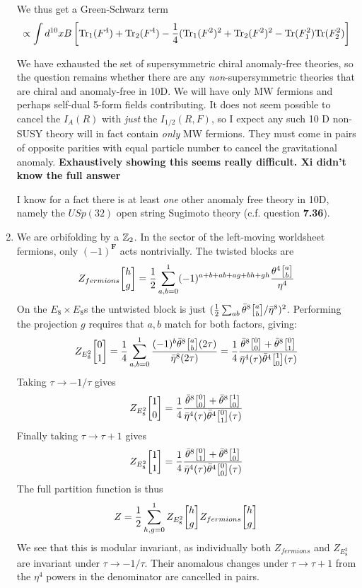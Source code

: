 \documentclass[11pt, class=article, crop=false]{standalone}
\begin{document}
\begin{enumerate}
	We thus get a Green-Schwarz term
	\[
		\propto \int d^{10} x B \left[\mathrm{Tr}_1 (F^4) + \mathrm{Tr}_2 (F^4) - \frac14 (\mathrm{Tr}_1(F^2)^2 + \mathrm{Tr}_2(F^2)^2 - \mathrm{Tr}(F_1^2) \mathrm{Tr}(F_2^2) \right]
	\]
	
	We have exhausted the set of supersymmetric chiral anomaly-free theories, so the question remains whether there are any \emph{non}-supersymmetric theories that are chiral and anomaly-free in 10D. We will have only MW fermions and perhaps self-dual 5-form fields contributing. It does not seem possible to cancel the $I_A(R)$ with \emph{just} the $I_{1/2}(R, F)$, so I expect any such 10 D non-SUSY theory will in fact contain \emph{only} MW fermions. They must come in pairs of opposite parities with equal particle number to cancel the gravitational anomaly. \textbf{Exhaustively showing this seems really difficult. Xi didn't know the full answer}
	
	I know for a fact there is at least \emph{one} other anomaly free theory in 10D, namely the $USp(32)$ open string Sugimoto theory (c.f. question \textbf{7.36}).

	\item We are orbifolding by a $\mathbb{Z}_2$. In the sector of the left-moving worldsheet fermions, only $(-1)^\mathbf{F}$ acts nontrivially. The twisted blocks are
	\[
		Z_{fermions} \twist hg = \frac12 \sum_{a, b = 0}^1 (-1)^{a + b + ab + a g + b h + gh} \frac{\theta^4 \twist ab}{\eta^4}
	\]
	On the $E_8 \times E_8$s the untwisted block is just $(\frac12 \sum_{ab} \bar \theta^8 \twist ab / \bar \eta^8)^2$. Performing the projection $g$ requires that $a, b$ match for both factors, giving:
	\[
		Z_{E_8^2} \twist 01 = \frac14 \sum_{a, b=0}^1 \frac{(-1)^b \bar \theta^{8} \twist{a}{b} (2 \tau)}{\bar \eta^{8}(2 \tau)} = \frac14 \frac{\bar \theta^8\twist00 + \bar \theta^8\twist01}{\bar \eta^4 (\tau) \bar \theta^4 \twist10 (\tau)}
	\]
	Taking $\tau \to -1/\tau$ gives
	\[
		Z_{E_8^2} \twist 10 = \frac14 \frac{\bar \theta^8\twist00 + \bar \theta^8\twist10}{\bar \eta^4 (\tau) \bar \theta^4 \twist01 (\tau)}
	\]
	Finally taking $\tau \to \tau+1$ gives
	\[
		Z_{E_8^2} \twist 11 = \frac14 \frac{\bar \theta^8\twist01 + \bar \theta^8\twist10}{\bar \eta^4 (\tau) \bar \theta^4 \twist00 (\tau)}
	\]
	The full partition function is thus
	\[
		Z = \frac12 \sum_{h, g = 0}^1 Z_{E_8^2} \twist hg Z_{fermions} \twist hg
	\]
	We see that this is modular invariant, as individually both $Z_{fermions}$ and $Z_{E_8^2}$ are invariant under $\tau \to -1/\tau$. Their anomalous changes under $\tau \to \tau+1$ from the $\eta^4$ powers in the denominator are cancelled in pairs. 
	

\end{enumerate}
\end{document}
